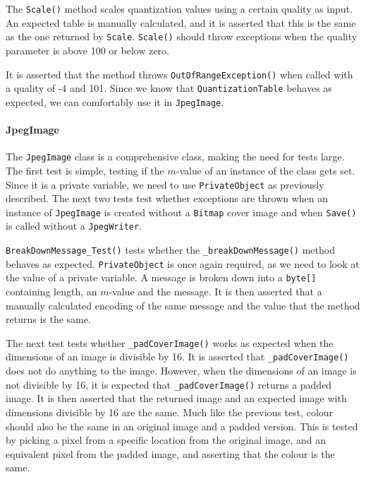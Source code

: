 The \lstinline|Scale()| method scales quantization values using a certain quality as input.
An expected table is manually calculated, and it is asserted that this is the same as the one returned by \lstinline|Scale|.
\lstinline|Scale()| should throw exceptions when the quality parameter is above 100 or below zero.

It is asserted that the method throws \lstinline|OutOfRangeException()| when called with a quality of -4 and 101.
Since we know that \lstinline|QuantizationTable| behaves as expected, we can comfortably use it in \lstinline|JpegImage|.

\paragraph*{JpegImage}
The \lstinline|JpegImage| class is a comprehensive class, making the need for tests large.
The first test is simple, testing if the $m$-value of an instance of the class gets set.
Since it is a private variable, we need to use \lstinline|PrivateObject| as previously described.
The next two tests test whether exceptions are thrown when an instance of \lstinline|JpegImage| is created without a \lstinline|Bitmap| cover image and when \lstinline|Save()| is called without a \lstinline|JpegWriter|.

\lstinline|BreakDownMessage_Test()| tests whether the \lstinline|_breakDownMessage()| method behaves as expected.
\lstinline|PrivateObject| is once again required, as we need to look at the value of a private variable.
A message is broken down into a \lstinline|byte[]| containing length, an $m$-value and the message.
It is then asserted that a manually calculated encoding of the same message and the value that the method returns is the same.

The next test tests whether \lstinline|_padCoverImage()| works as expected when the dimensions of an image is divisible by 16.
It is asserted that \lstinline|_padCoverImage()| does not do anything to the image.
However, when the dimensions of an image is not divisible by 16, it is expected that \lstinline|_padCoverImage()| returns a padded image.
It is then asserted that the returned image and an expected image with dimensions divisible by 16 are the same.
Much like the previous test, colour should also be the same in an original image and a padded version.
This is tested by picking a pixel from a specific location from the original image, and an equivalent pixel from the padded image, and asserting that the colour is the same.

